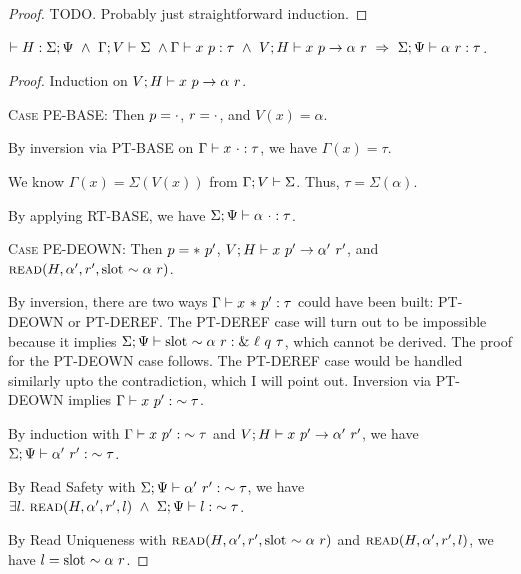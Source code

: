 \documentclass{article}
\begin{document}
\begin{proof}
  TODO. Probably just straightforward induction.
\end{proof}

\begin{lem}
  $\HWF{H}{\Sigma}{\Psi}\ \land\ \SWF{\Gamma}{V}{\Sigma}\ \land\ \\
   \PType{\Gamma}{x}{p}{\tau}\ \land\ \PEval{V}{H}{x}{p}{\alpha}{r}\ \Rightarrow\
   \ARType{\Sigma}{\Psi}{\alpha}{r}{\tau}$.
\end{lem}

\begin{proof}
  Induction on ${{V};{H}} \vdash {{x}\ {p}} \rightarrow {{\alpha}\ {r}}$.

  \textsc{Case PE-BASE}:
    Then $p = \cdot$, $r = \cdot$, and $V(x) = \alpha$.

    By inversion via \textsc{PT-BASE} on ${{\Gamma}} \vdash {{x}\ {\cdot}} : {{\tau}}$, we have $\Gamma(x)=\tau$.

    We know $\Gamma(x) = \Sigma(V(x))$ from ${\Gamma}; {V} \vdash {\Sigma}$.
    Thus, $\tau = \Sigma(\alpha)$.

    By applying \textsc{RT-BASE}, we have ${{{\Sigma}} ;{{\Psi}}} \vdash {{{\alpha}\ {\cdot}}} : {{{\tau}}}$.

  \textsc{Case PE-DEOWN}:
    Then $p = *\ {p'}$, ${{V};{H}} \vdash {{x}\ {p'}} \rightarrow {{\alpha'}\ {r'}}$,
    and $\textsc{read}({H},{\alpha'},{r'},{\textrm{slot}\ {\sim {{\alpha}\ {r}}}})$.

    By inversion, there are two ways ${{\Gamma}} \vdash {{x}\ {*\ {p'}}} : {{\tau}}$ could have been built:
    \textsc{PT-DEOWN} or \textsc{PT-DEREF}. The \textsc{PT-DEREF} case will turn out to be
    impossible because it implies
    ${{\Sigma} ;{\Psi}} \vdash {{\textrm{slot}\ {\sim {{\alpha}\ {r}}}}} : {{\&\ {\ell}\ {q}\ {\tau}}}$, which cannot be
    derived. The proof for the \textsc{PT-DEOWN} case follows. The \textsc{PT-DEREF} case would
    be handled similarly upto the contradiction, which I will point out.
    Inversion via \textsc{PT-DEOWN} implies ${{\Gamma}} \vdash {{x}\ {p'}} : {{\sim {\tau}}}$.

    By induction with ${{\Gamma}} \vdash {{x}\ {p'}} : {{\sim {\tau}}}$ and ${{V};{H}} \vdash {{x}\ {p'}} \rightarrow {{\alpha'}\ {r'}}$,
    we have ${{{\Sigma}} ;{{\Psi}}} \vdash {{{\alpha'}\ {r'}}} : {{{\sim {\tau}}}}$.

    By Read Safety with ${{{\Sigma}} ;{{\Psi}}} \vdash {{{\alpha'}\ {r'}}} : {{{\sim {\tau}}}}$, we have
    $\exists l.\ \Read{H}{\alpha'}{r'}{l}\ \land\ \RTType{\Sigma}{\Psi}{l}{\Own{\tau}}$.

    By Read Uniqueness with $\textsc{read}({H},{\alpha'},{r'},{\textrm{slot}\ {\sim {{\alpha}\ {r}}}})$ and
    $\textsc{read}({H},{\alpha'},{r'},{l})$, we have $l = \textrm{slot}\ {\sim {{\alpha}\ {r}}}$.


\end{proof}
\end{document}
